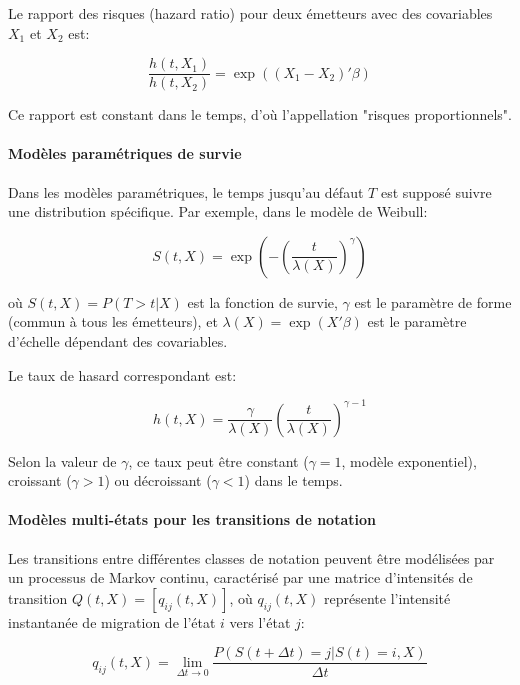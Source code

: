 Le rapport des risques (hazard ratio) pour deux émetteurs avec des covariables $X_1$ et $X_2$ est:

\begin{equation}
\frac{h(t,X_1)}{h(t,X_2)} = \exp((X_1-X_2)'\beta)
\end{equation}

Ce rapport est constant dans le temps, d'où l'appellation "risques proportionnels".

\paragraph{Modèles paramétriques de survie}
Dans les modèles paramétriques, le temps jusqu'au défaut $T$ est supposé suivre une distribution spécifique. Par exemple, dans le modèle de Weibull:

\begin{equation}
S(t,X) = \exp\left(-\left(\frac{t}{\lambda(X)}\right)^\gamma\right)
\end{equation}

où $S(t,X) = P(T > t|X)$ est la fonction de survie, $\gamma$ est le paramètre de forme (commun à tous les émetteurs), et $\lambda(X) = \exp(X'\beta)$ est le paramètre d'échelle dépendant des covariables.

Le taux de hasard correspondant est:

\begin{equation}
h(t,X) = \frac{\gamma}{\lambda(X)} \left(\frac{t}{\lambda(X)}\right)^{\gamma-1}
\end{equation}

Selon la valeur de $\gamma$, ce taux peut être constant ($\gamma = 1$, modèle exponentiel), croissant ($\gamma > 1$) ou décroissant ($\gamma < 1$) dans le temps.

\paragraph{Modèles multi-états pour les transitions de notation}
Les transitions entre différentes classes de notation peuvent être modélisées par un processus de Markov continu, caractérisé par une matrice d'intensités de transition $Q(t,X) = [q_{ij}(t,X)]$, où $q_{ij}(t,X)$ représente l'intensité instantanée de migration de l'état $i$ vers l'état $j$:

\begin{equation}
q_{ij}(t,X) = \lim_{\Delta t \to 0} \frac{P(S(t+\Delta t) = j | S(t) = i, X)}{\Delta t}
\end{equation}

